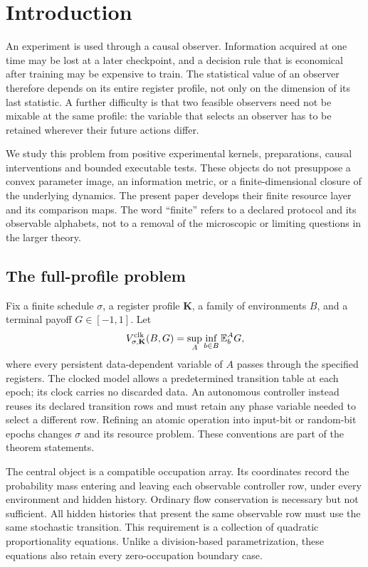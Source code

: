 \section{Introduction}
An experiment is used through a causal observer. Information acquired
at one time may be lost at a later checkpoint, and a decision rule
that is economical after training may be expensive to train. The
statistical value of an observer therefore depends on its entire
register profile, not only on the dimension of its last statistic.
A further difficulty is that two feasible observers need not be
mixable at the same profile: the variable that selects an observer
has to be retained wherever their future actions differ.

We study this problem from positive experimental kernels, preparations,
causal interventions and bounded executable tests. These objects do
not presuppose a convex parameter image, an information metric, or a
finite-dimensional closure of the underlying dynamics. The present
paper develops their finite resource layer and its comparison maps.
The word ``finite'' refers to a declared protocol and its observable
alphabets, not to a removal of the microscopic or limiting questions
in the larger theory.

\subsection{The full-profile problem}
Fix a finite schedule $\sigma$, a register profile $\mathbf K$, a
family of environments $B$, and a terminal payoff $G\in[-1,1]$. Let
\[
 V^{\rm clk}_{\sigma,\mathbf K}(B,G)
       =\sup_A\inf_{b\in B}\mathbb E_b^A G,
\]
where every persistent data-dependent variable of $A$ passes through
the specified registers. The clocked model allows a predetermined
transition table at each epoch; its clock carries no discarded data.
An autonomous controller instead reuses its declared transition rows
and must retain any phase variable needed to select a different row.
Refining an atomic operation into input-bit or random-bit epochs
changes $\sigma$ and its resource problem. These conventions are part
of the theorem statements.

The central object is a compatible occupation array. Its coordinates
record the probability mass entering and leaving each observable
controller row, under every environment and hidden history. Ordinary
flow conservation is necessary but not sufficient. All hidden histories
that present the same observable row must use the same stochastic
transition. This requirement is a collection of quadratic proportionality
equations. Unlike a division-based parametrization, these equations
also retain every zero-occupation boundary case.

